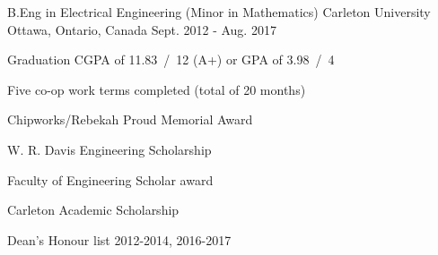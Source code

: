 

\begin{cventries}

  \cventry
    {B.Eng in Electrical Engineering (Minor in Mathematics)} %
    {Carleton University} %
    {Ottawa, Ontario, Canada} %
    {Sept. 2012 - Aug. 2017} %
    {
      \begin{cvitems} %
        \item {Graduation CGPA of 11.83~/~12 (A+) or GPA of 3.98~/~4}
        \item {Five co-op work terms completed (total of 20 months)}
        \item {Chipworks/Rebekah Proud Memorial Award}
        \item {W. R. Davis Engineering Scholarship}
        \item {Faculty of Engineering Scholar award}
        \item {Carleton Academic Scholarship}
        \item {Dean's Honour list 2012-2014, 2016-2017}
      \end{cvitems}
    }

\end{cventries}
